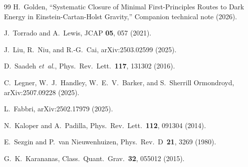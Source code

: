 \documentclass[aps,prd,twocolumn,superscriptaddress,showpacs,preprintnumbers,
  nofootinbib,longbibliography,floatfix]{revtex4-2}
\newcommand{\etal}{\textit{et~al.}}
\begin{document}
\begin{thebibliography}{99}
H.~Golden,
``Systematic Closure of Minimal First-Principles Routes to Dark Energy
in Einstein-Cartan-Holst Gravity,''
Companion technical note (2026).

J.~Torrado and A.~Lewis,
JCAP \textbf{05}, 057 (2021).

J.~Liu, R.~Niu, and R.-G.~Cai,
arXiv:2503.02599 (2025).

D.~Saadeh \etal,
Phys.\ Rev.\ Lett.\ \textbf{117}, 131302 (2016).

C.~Legner, W.~J.~Handley, W.~E.~V.~Barker, and S.~Sherrill Ormondroyd,
arXiv:2507.09228 (2025).

L.~Fabbri,
arXiv:2502.17979 (2025).

N.~Kaloper and A.~Padilla,
Phys.\ Rev.\ Lett.\ \textbf{112}, 091304 (2014).

E.~Sezgin and P.~van Nieuwenhuizen,
Phys.\ Rev.\ D~\textbf{21}, 3269 (1980).

G.~K.~Karananas,
Class.\ Quant.\ Grav.\ \textbf{32}, 055012 (2015).

\end{thebibliography}
\end{document}
